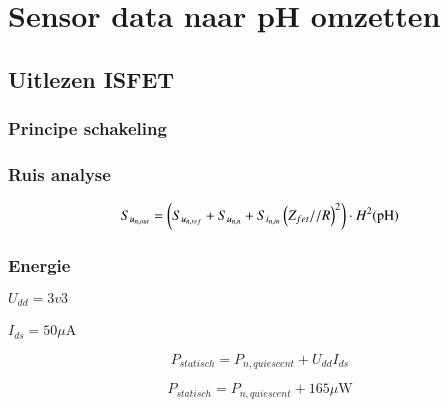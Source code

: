 \section{Sensor data naar pH omzetten}

\subsection*{Uitlezen ISFET}

    \begin{frame}
        \frametitle{Principe schakeling}
    
        \begin{figure}
            \centering
            \def\svgwidth{0.6\textwidth}
            
        \end{figure}
    
    \end{frame}
    \begin{frame}
        \frametitle{Ruis analyse}
    
        \begin{figure}
            \centering
            \def\svgwidth{0.6\textwidth}
            
        \end{figure}
        \begin{equation}\label{eq:measureNoiseOut}
            S_{u_{{n,out}}} = \left(S_{u_{{n,ref}}} + S_{u_{{n,n}}} + S_{i_{{n,in}}}\left(Z_{fet} // R\right)^2\right) \cdot H^2(\mathrm{pH})
        \end{equation}
    
    \end{frame}
    \begin{frame}
        \frametitle{Energie}

        $U_{dd}=3v3$

        \noindent
        $I_{ds}=50\mu$A
    
        \begin{equation}\label{eq:measurePower}
            P_{statisch} = P_{n,quiescent} + U_{dd}I_{ds}
        \end{equation}

        \pause

        \begin{equation}
            P_{statisch} = P_{n,quiescent} + 165\mu\mathrm{W}
        \end{equation}
    
    \end{frame}

